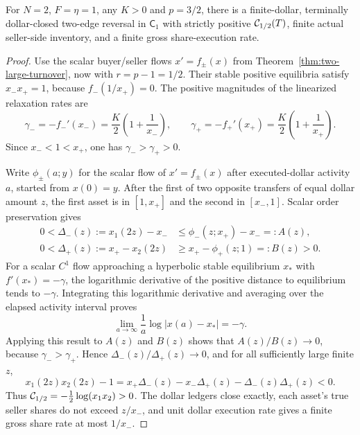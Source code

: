 \documentclass[review,hidelinks,onefignum,onetabnum]{siamonline250211}%
\begin{document}
\begin{proposition}[The critical two-node exponent $p=3/2$ is also reachable]
\label{prop:two-critical-p}
For $N=2$, $F=\eta=1$, any $K>0$ and $p=3/2$,
there is a finite-dollar, terminally dollar-closed
two-edge reversal in $\mathsf C_1$ with strictly positive
$\mathcal{C}_{1/2}(T)$, finite actual seller-side inventory,
and a finite gross share-execution rate.
\end{proposition}
\begin{proof}
Use the scalar buyer/seller flows $x'=f_\pm(x)$ from
Theorem~\ref{thm:two-large-turnover}, now with $r=p-1=1/2$.
Their stable positive equilibria satisfy $x_-x_+=1$,
because $f_-(1/x_+)=0$.
The positive magnitudes of the linearized relaxation
rates are
\[
 \gamma_-=-f_-'(x_-)
   =\frac K2\left(1+\frac1{x_-}\right),\qquad
 \gamma_+=-f_+'(x_+)
   =\frac K2\left(1+\frac1{x_+}\right).
\]
Since $x_-<1<x_+$, one has $\gamma_->\gamma_+>0$.

Write $\phi_\pm(a;y)$ for the scalar flow of
$x'=f_\pm(x)$ after executed-dollar activity $a$,
started from $x(0)=y$. After the first of two
opposite transfers of equal dollar amount $z$,
the first asset is in $[1,x_+]$ and the second
in $[x_-,1]$. Scalar order preservation gives
\[
 \begin{aligned}
 0<\Delta_-(z):=x_1(2z)-x_-
   &\le\phi_-(z;x_+)-x_-=:A(z),\\
 0<\Delta_+(z):=x_+-x_2(2z)
   &\ge x_+-\phi_+(z;1)=:B(z)>0.
 \end{aligned}
\]
For a scalar $C^1$ flow approaching a hyperbolic
stable equilibrium $x_*$ with $f'(x_*)=-\gamma$,
the logarithmic derivative of the positive distance
to equilibrium tends to $-\gamma$. Integrating
this logarithmic derivative and averaging over
the elapsed activity interval proves
\[
 \lim_{a\to\infty}
    \frac{1}{a}\log|x(a)-x_*|=-\gamma.
\]
Applying this result to $A(z)$ and $B(z)$
shows that $A(z)/B(z)\to0$, because
$\gamma_->\gamma_+$. Hence
$\Delta_-(z)/\Delta_+(z)\to0$, and for all
sufficiently large finite $z$,
\[
 x_1(2z)x_2(2z)-1
 =x_+\Delta_-(z)-x_-\Delta_+(z)
                     -\Delta_-(z)\Delta_+(z)<0.
\]
Thus $\mathcal{C}_{1/2}=-\tfrac12\log(x_1x_2)>0$.
The dollar ledgers close exactly, each asset's
true seller shares do not exceed $z/x_-$,
and unit dollar execution rate gives a finite
gross share rate at most $1/x_-$.
\end{proof}
\end{document}
